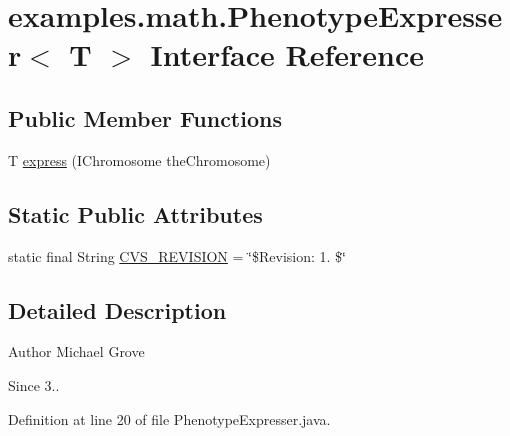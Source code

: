 \hypertarget{interfaceexamples_1_1math_1_1_phenotype_expresser_3_01_t_01_4}{\section{examples.\-math.\-Phenotype\-Expresser$<$ T $>$ Interface Reference}
\label{interfaceexamples_1_1math_1_1_phenotype_expresser_3_01_t_01_4}
}
\subsection*{Public Member Functions}
\begin{DoxyCompactItemize}
\item 
T \hyperlink{interfaceexamples_1_1math_1_1_phenotype_expresser_3_01_t_01_4_ad66292f8ea4ec71b9f4630e0bdbcae45}{express} (I\-Chromosome the\-Chromosome)
\end{DoxyCompactItemize}
\subsection*{Static Public Attributes}
\begin{DoxyCompactItemize}
\item 
static final String \hyperlink{interfaceexamples_1_1math_1_1_phenotype_expresser_3_01_t_01_4_a13d75f3edce882fbfa24d5eac9fb4324}{C\-V\-S\-\_\-\-R\-E\-V\-I\-S\-I\-O\-N} = \char`\"{}\$Revision\-: 1. \$\char`\"{}
\end{DoxyCompactItemize}


\subsection{Detailed Description}
\begin{DoxyAuthor}{Author}
Michael Grove 
\end{DoxyAuthor}
\begin{DoxySince}{Since}
3.. 
\end{DoxySince}


Definition at line 20 of file Phenotype\-Expresser.\-java.



